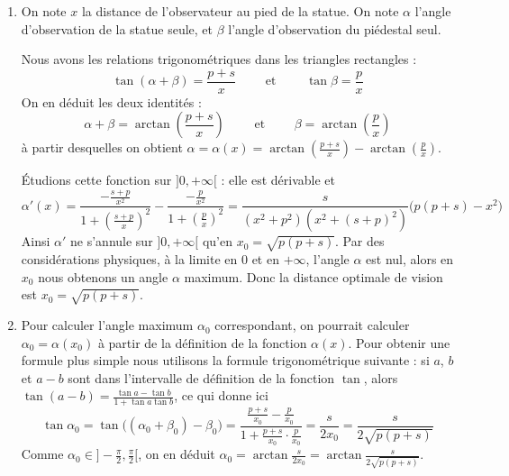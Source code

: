 \documentclass[11pt,a4paper]{article}
\newcommand{\Arctan}{\mathop{\mathrm{arctan}}\nolimits}
\begin{document}
\begin{enumerate}
  \item 

On note $x$ la distance de l'observateur au pied de la statue.
On note $\alpha$ l'angle d'observation de la statue seule, et $\beta$
l'angle d'observation du piédestal seul.

\begin{center}
\end{center}

Nous avons les relations trigonométriques dans les triangles rectangles :
$$\tan(\alpha+\beta) = \frac{p+s}{x} \qquad\text{ et }\qquad \tan\beta = \frac{p}{x}$$
On en déduit les deux identités :
$$\alpha+\beta = \Arctan\left(\frac{p+s}{x}\right) \qquad\text{ et }\qquad \beta = \Arctan\left(\frac{p}{x}\right)$$
à partir desquelles on obtient $\alpha=\alpha(x)=\Arctan\left(\frac{p+s}{x}\right)-\Arctan\left(\frac{p}{x}\right)$.

\'Etudions cette fonction sur $]0,+\infty[$ : elle est dérivable et 
$$\alpha'(x)=\frac{-\frac{s+p}{x^2}}{1+\left(\frac{s+p}{x}\right)^2}-\frac{-\frac{p}{x^2}}{1+\left(\frac{p}{x}\right)^2}=\frac{s}{(x^2+p^2)(x^2+(s+p)^2)}\big(p(p+s)-x^2\big)$$
Ainsi $\alpha'$ ne s'annule sur $]0,+\infty[$ qu'en $x_0 = \sqrt{p(p+s)}$.
Par des considérations physiques, à la limite en $0$ et en $+\infty$, 
l'angle $\alpha$ est nul,
alors en $x_0$ nous obtenons un angle $\alpha$ maximum.
Donc la distance optimale de vision est  $x_0 = \sqrt{p(p+s)}$.

\item
Pour calculer l'angle maximum $\alpha_0$ correspondant, on pourrait 
calculer $\alpha_0 = \alpha(x_0)$ à partir de la définition de la fonction
$\alpha(x)$. Pour obtenir une formule plus simple nous 
utilisons la formule trigonométrique suivante : si
$a$, $b$ et $a-b$ sont dans l'intervalle de définition de la fonction $\tan$, alors
$\tan(a-b)=\frac{\tan a-\tan b}{1+\tan a \tan b}$, ce qui donne ici
$$\tan\alpha_0 = \tan\big( (\alpha_0+\beta_0) - \beta_0 \big)
=\frac{\frac{p+s}{x_0}-\frac{p}{x_0}}{1+\frac{p+s}{x_0}\cdot\frac{p}{x_0}}
= \frac{s}{2x_0}=\frac{s}{2\sqrt{p(p+s)}}$$
Comme $\alpha_0\in]-\frac{\pi}{2},\frac{\pi}{2}[$, 
on en déduit $\alpha_0 = \Arctan \frac{s}{2x_0} = \Arctan \frac{s}{2\sqrt{p(p+s)}}$.


\end{enumerate}
\end{document}
